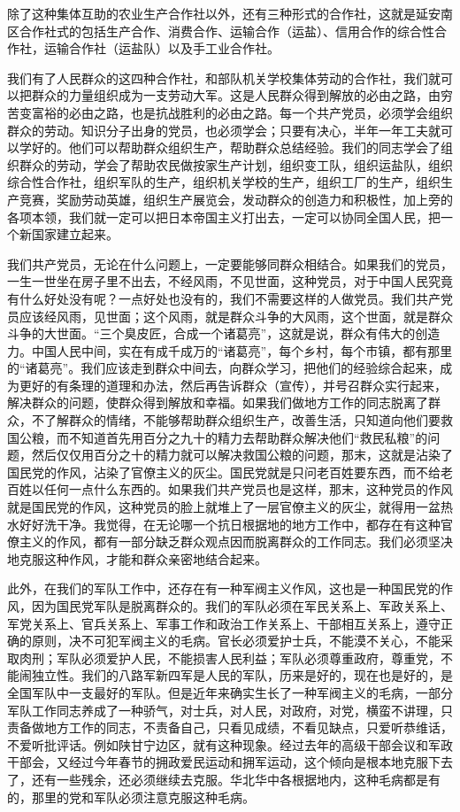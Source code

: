 除了这种集体互助的农业生产合作社以外，还有三种形式的合作社，这就是延安南区合作社式的包括生产合作、消费合作、运输合作（运盐）、信用合作的综合性合作社，运输合作社（运盐队）以及手工业合作社。

我们有了人民群众的这四种合作社，和部队机关学校集体劳动的合作社，我们就可以把群众的力量组织成为一支劳动大军。这是人民群众得到解放的必由之路，由穷苦变富裕的必由之路，也是抗战胜利的必由之路。每一个共产党员，必须学会组织群众的劳动。知识分子出身的党员，也必须学会；只要有决心，半年一年工夫就可以学好的。他们可以帮助群众组织生产，帮助群众总结经验。我们的同志学会了组织群众的劳动，学会了帮助农民做按家生产计划，组织变工队，组织运盐队，组织综合性合作社，组织军队的生产，组织机关学校的生产，组织工厂的生产，组织生产竞赛，奖励劳动英雄，组织生产展览会，发动群众的创造力和积极性，加上旁的各项本领，我们就一定可以把日本帝国主义打出去，一定可以协同全国人民，把一个新国家建立起来。

我们共产党员，无论在什么问题上，一定要能够同群众相结合。如果我们的党员，一生一世坐在房子里不出去，不经风雨，不见世面，这种党员，对于中国人民究竟有什么好处没有呢？一点好处也没有的，我们不需要这样的人做党员。我们共产党员应该经风雨，见世面；这个风雨，就是群众斗争的大风雨，这个世面，就是群众斗争的大世面。“三个臭皮匠，合成一个诸葛亮”，这就是说，群众有伟大的创造力。中国人民中间，实在有成千成万的“诸葛亮”，每个乡村，每个市镇，都有那里的“诸葛亮”。我们应该走到群众中间去，向群众学习，把他们的经验综合起来，成为更好的有条理的道理和办法，然后再告诉群众（宣传），并号召群众实行起来，解决群众的问题，使群众得到解放和幸福。如果我们做地方工作的同志脱离了群众，不了解群众的情绪，不能够帮助群众组织生产，改善生活，只知道向他们要救国公粮，而不知道首先用百分之九十的精力去帮助群众解决他们“救民私粮”的问题，然后仅仅用百分之十的精力就可以解决救国公粮的问题，那末，这就是沾染了国民党的作风，沾染了官僚主义的灰尘。国民党就是只问老百姓要东西，而不给老百姓以任何一点什么东西的。如果我们共产党员也是这样，那末，这种党员的作风就是国民党的作风，这种党员的脸上就堆上了一层官僚主义的灰尘，就得用一盆热水好好洗干净。我觉得，在无论哪一个抗日根据地的地方工作中，都存在有这种官僚主义的作风，都有一部分缺乏群众观点因而脱离群众的工作同志。我们必须坚决地克服这种作风，才能和群众亲密地结合起来。

此外，在我们的军队工作中，还存在有一种军阀主义作风，这也是一种国民党的作风，因为国民党军队是脱离群众的。我们的军队必须在军民关系上、军政关系上、军党关系上、官兵关系上、军事工作和政治工作关系上、干部相互关系上，遵守正确的原则，决不可犯军阀主义的毛病。官长必须爱护士兵，不能漠不关心，不能采取肉刑；军队必须爱护人民，不能损害人民利益；军队必须尊重政府，尊重党，不能闹独立性。我们的八路军新四军是人民的军队，历来是好的，现在也是好的，是全国军队中一支最好的军队。但是近年来确实生长了一种军阀主义的毛病，一部分军队工作同志养成了一种骄气，对士兵，对人民，对政府，对党，横蛮不讲理，只责备做地方工作的同志，不责备自己，只看见成绩，不看见缺点，只爱听恭维话，不爱听批评话。例如陕甘宁边区，就有这种现象。经过去年的高级干部会议和军政干部会，又经过今年春节的拥政爱民运动和拥军运动，这个倾向是根本地克服下去了，还有一些残余，还必须继续去克服。华北华中各根据地内，这种毛病都是有的，那里的党和军队必须注意克服这种毛病。

